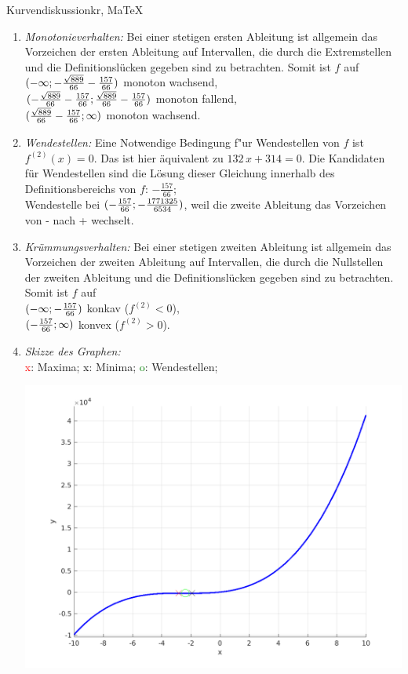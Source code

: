 \begin{MAufgabe}{Kurvendiskussion}{kr, MaTeX}
\begin{enumerate}
 \item \emph{Monotonieverhalten:} 
 Bei einer stetigen ersten Ableitung ist allgemein das Vorzeichen der ersten Ableitung auf Intervallen, die durch die Extremstellen und die Definitionsl\"ucken gegeben sind zu betrachten. Somit ist $f$ auf \\ 
 $(-\infty; - \frac{\sqrt{889}}{66} - \frac{157}{66})$ monoton wachsend, \\ 
 $( - \frac{\sqrt{889}}{66} - \frac{157}{66};\frac{\sqrt{889}}{66} - \frac{157}{66})$ monoton  fallend, \\ 
 $(\frac{\sqrt{889}}{66} - \frac{157}{66}; \infty)$ monoton wachsend. \\ 
 \item \emph{Wendestellen:} 
 Eine Notwendige Bedingung f"ur Wendestellen von $f$ ist $f^{(2)}(x)=0$. 
 Das ist hier \"aquivalent zu $132\, x + 314=0$. 
 Die Kandidaten f\"ur Wendestellen sind die L\"osung dieser Gleichung innerhalb des Definitionsbereichs von $f$: $- \frac{157}{66}$; \\ 
 Wendestelle bei $(- \frac{157}{66};- \frac{1771325}{6534})$, weil die zweite Ableitung das Vorzeichen von - nach + wechselt. \\ 
 \item \emph{Kr\"ummungsverhalten:} 
 Bei einer stetigen zweiten Ableitung ist allgemein das Vorzeichen der zweiten Ableitung auf Intervallen, die durch die Nullstellen der zweiten Ableitung und die Definitionsl\"ucken gegeben sind zu betrachten. 
 Somit ist $f$ auf \\ 
 $(-\infty ;- \frac{157}{66})$  konkav ($f^{(2)}<0$), \\ 
 $(- \frac{157}{66}; \infty)$  konvex ($f^{(2)}>0$). \\ 
 \item \emph{Skizze des Graphen:} \\ 
 {\textcolor{red} x}: Maxima; {\textcolor{black} x}: Minima; {\textcolor{green} o}: Wendestellen; 
  \begin{center}
  \includegraphics[width=0.8\linewidth]{Abb_zur_Ag_autogenerated_fractions_30.png} \end{center}
  
 \end{enumerate}
 \else\relax\fi
  \end{MAufgabe}